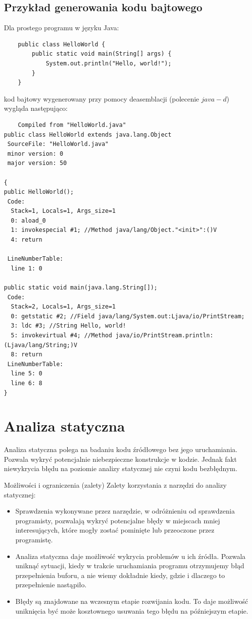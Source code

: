 \documentclass{pracamgr}
\begin{document}
    \section{Przykład generowania kodu bajtowego}
    Dla prostego programu w języku Java:
    \begin{verbatim}
    public class HelloWorld {
        public static void main(String[] args) {
            System.out.println("Hello, world!");
        }
    }
    \end{verbatim}
    kod bajtowy wygenerowany przy pomocy deasemblacji (polecenie $java -d$) wygląda następująco:
    \begin{verbatim}
    Compiled from "HelloWorld.java"
public class HelloWorld extends java.lang.Object
 SourceFile: "HelloWorld.java"
 minor version: 0
 major version: 50

{
public HelloWorld();
 Code:
  Stack=1, Locals=1, Args_size=1
  0: aload_0
  1: invokespecial #1; //Method java/lang/Object."<init>":()V
  4: return

 LineNumberTable:
  line 1: 0

public static void main(java.lang.String[]);
 Code:
  Stack=2, Locals=1, Args_size=1
  0: getstatic #2; //Field java/lang/System.out:Ljava/io/PrintStream;
  3: ldc #3; //String Hello, world!
  5: invokevirtual #4; //Method java/io/PrintStream.println:(Ljava/lang/String;)V
  8: return
 LineNumberTable:
  line 5: 0
  line 6: 8
}
    \end{verbatim}
    

\chapter{Analiza statyczna}\label{r:staticanalysis}

    Analiza statyczna polega na badaniu kodu źródłowego bez jego uruchamiania. Pozwala wykryć potencjalnie
    niebezpieczne konstrukcje w kodzie. Jednak fakt niewykrycia błędu na poziomie analizy statycznej nie czyni
    kodu bezbłędnym.
    
    Możliwości i ograniczenia (zalety)
    Zalety korzystania z narzędzi do analizy statycznej:
    \begin{itemize}
        \item Sprawdzenia wykonywane przez narzędzie, w odróżnieniu od sprawdzenia programisty,
              pozwalają wykryć potencjalne błędy w miejscach mniej interesujących, które mogły zostać pominięte
              lub przeoczone przez programistę.
        \item Analiza statyczna daje możliwość wykrycia problemów u ich źródła. Pozwala uniknąć sytuacji,
              kiedy w trakcie uruchamiania programu otrzymujemy błąd przepełnienia buforu, a nie wiemy dokładnie
              kiedy, gdzie i dlaczego to przepełnienie nastąpiło.
        \item Błędy są znajdowane na wczesnym etapie rozwijania kodu. To daje możliwość uniknięcia być może
              kosztownego usuwania tego błędu na późniejszym etapie.
    \end{itemize}
    
\end{document}

